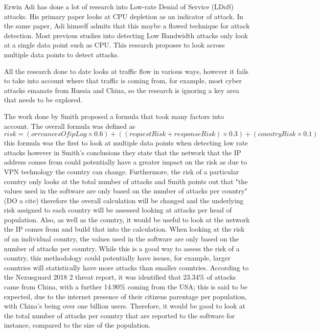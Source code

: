 Erwin Adi has done a lot of research into Low-rate Denial of Service (LDoS) attacks. His primary paper looks at CPU depletion as an indicator of attack. In the same paper, Adi himself admits that this maybe a flawed technique for attack detection. \cite{Adi2016} Most previous studies into detecting Low Bandwidth attacks only look at a single data point such as CPU. This research proposes to look across multiple data points to detect attacks.

All the research done to date looks at traffic flow in various ways, however it fails to take into account where that traffic is coming from, for example, most cyber attacks emanate from Russia and China, so the research is ignoring a key area that needs to be explored.


The work done by Smith proposed a formula that took many factors  into account. The overall formula was defined as  \[risk = (orrcancesOfipLog \times 0.6) + ((requestRisk+responseRisk) \times 0.3) + (countryRisk \times  0.1) \] this formula was the first to look at multiple data points when detecting low rate attacks however in Smith's conclusions they state that the network that the IP address comes from could potentially have a greater impact on the risk as due to VPN technology the country can change. Furthermore, the risk of a particular country only looks at the total number of attacks and Smith points out that  "the values used in the software are only based on the number of attacks per country" (DO a cite) therefore the overall calculation will be changed and the underlying risk assigned to each country will be assessed looking at attacks per head of population. Also, as well as the country, it would be useful to look at the network the IP comes from and build that into the calculation. When looking at the risk of an individual country, the values used in the software are only based on the number of attacks per country. While this is a good way to assess the risk of a country, this methodology could potentially have issues, for example, larger countries will statistically have more attacks than smaller countries. According to the Nexusguard 2018 2 threat report, it was identified that 23.34\% of attacks came from China, with a further 14.90\% coming from the USA; this is said to be expected, due to the internet presence of their citizens parentage per population, with China's being over one billion users. Therefore, it would be good to look at the total number of attacks per country that are reported to the software for instance, compared to the size of the population. 


